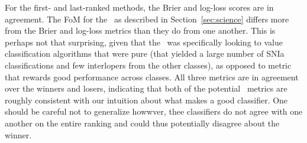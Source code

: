 For the first- and last-ranked methods, the Brier and log-loss scores are in agreement. 
The FoM for the \snphotcc\, as described in Section~\ref{sec:science} differs more from the Brier and log-loss metrics than they do from one another. This is perhaps not that surprising, given that the \snphotcc\ was specifically looking to value classification algorithms that were pure (that yielded a large number of SNIa classifications and few interlopers from the other classes), as opposed to metric that rewards good performance across classes. All three metrics are in agreement over the winners and losers, indicating that both of the potential \plasticc\ metrics are roughly consistent with our intuition about what makes a good classifier. One should be careful not to generalize howwver, thee classifiers do not agree with one another on the entire ranking and could thus potentially disagree about the winner.

